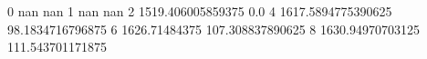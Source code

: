0 nan nan
1 nan nan
2 1519.406005859375 0.0
4 1617.5894775390625 98.1834716796875
6 1626.71484375 107.308837890625
8 1630.94970703125 111.543701171875
